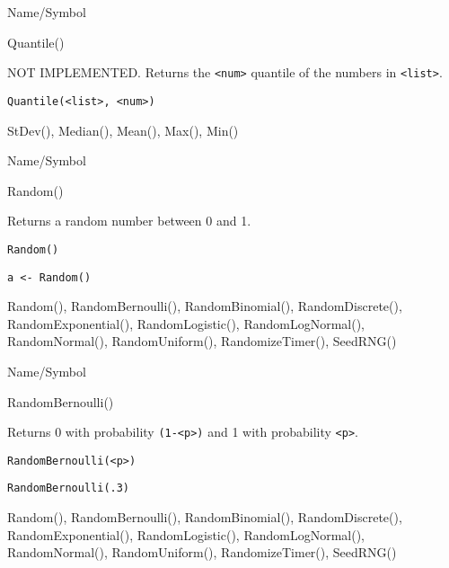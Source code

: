 \rl


\begin{desc}{Name/Symbol}
\item[Name/Symbol]	Quantile()

\item[Description]	NOT IMPLEMENTED. Returns the \verb+<num>+ quantile of
		the numbers in \verb+<list>+.

\item[Usage]		
\begin{verbatim}
Quantile(<list>, <num>)
\end{verbatim}

\item[Example]	

\item[See Also]	StDev(), Median(), Mean(), Max(), Min()
\end{desc}

\rl




\begin{desc}{Name/Symbol}
\item[Name/Symbol]	Random()

\item[Description]	Returns a random number between 0 and 1.

\item[Usage]
\begin{verbatim}
Random()
\end{verbatim}

\item[Example]
\begin{verbatim}
a <- Random()
\end{verbatim}

\item[See Also]		Random(), RandomBernoulli(), RandomBinomial(), RandomDiscrete(), RandomExponential(), RandomLogistic(), RandomLogNormal(), RandomNormal(), RandomUniform(), RandomizeTimer(), SeedRNG()
\end{desc}

\rl


\begin{desc}{Name/Symbol}
\item[Name/Symbol]	RandomBernoulli()

\item[Description]	Returns 0 with probability \verb+(1-<p>)+ and 1 with probability \verb+<p>+.

\item[Usage]		
\begin{verbatim}
RandomBernoulli(<p>)
\end{verbatim}

\item[Example]	
\begin{verbatim}
RandomBernoulli(.3)
\end{verbatim}

\item[See Also]		Random(), RandomBernoulli(), RandomBinomial(), RandomDiscrete(), RandomExponential(), RandomLogistic(),
	    	RandomLogNormal(), RandomNormal(), RandomUniform(),
	    	RandomizeTimer(), SeedRNG()    
\end{desc}

